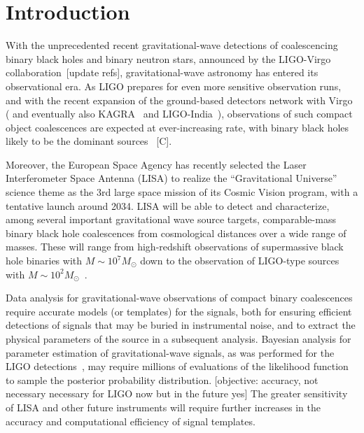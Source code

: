 \documentclass[aps,showpacs,twocolumn,
prd,superscriptaddress,nofootinbib]{revtex4-1}
\newcommand{\Msol}{M_{\odot}}
\newcommand{\SM}[1]{{\color{Red} #1}}
\newcommand{\jgb}[1]{{\color{DarkGreen} #1}}
\begin{document}
\maketitle


\section{Introduction}
\label{sec:intro}

\jgb{With the unprecedented recent gravitational-wave detections of coalescencing binary black holes and binary neutron stars, announced by the LIGO-Virgo collaboration~\cite{LIGO-theevent-2016,LIGO-christmasevent-2016,LIGO-O1BBH-2016}[update refs], gravitational-wave astronomy has entered its observational era. As LIGO prepares for even more sensitive observation runs, and with the recent expansion of the ground-based detectors network with Virgo~\cite{Virgo} ( and eventually also KAGRA~\cite{KAGRA} and LIGO-India~\cite{INDIGO}), observations of such compact object coalescences are expected at ever-increasing rate, with binary black holes likely to be the dominant sources~\cite{} \SM{[C]}.}

  \jgb{Moreover, the European Space Agency has recently selected the Laser Interferometer Space Antenna (LISA)\cite{LISA17} to realize the ``Gravitational Universe'' science theme\cite{GravitationalUniverse2013} as the 3rd large space mission of its Cosmic Vision program, with a tentative launch around 2034. LISA will be able to detect and characterize, among several important gravitational wave source targets, comparable-mass binary black hole coalescences from cosmological distances over a wide range of masses. These will range from high-redshift observations of supermassive black hole binaries with $M\sim 10^{7} \Msol$ down to the observation of LIGO-type sources with $M\sim 10^{2} \Msol$~\cite{Sesana16}.}

  Data analysis for gravitational-wave observations of compact binary coalescences require accurate models (or templates) for the signals, both for ensuring efficient detections of signals that may be buried in instrumental noise, and to extract the physical parameters of the source in a subsequent analysis. Bayesian analysis for parameter estimation of gravitational-wave signals, as was performed for the LIGO detections~\cite{LIGO-theeventPE-2016,LIGO-O1BBH-2016}, may require millions of evaluations of the likelihood function to sample the posterior probability distribution. \SM{[objective: accuracy, not necessary necessary for LIGO now but in the future yes]} The greater sensitivity of LISA and other future instruments will require further increases in the accuracy and computational efficiency of signal templates.
\end{document}
